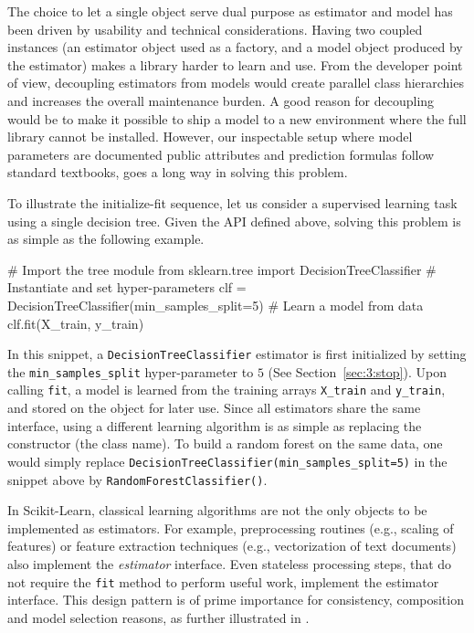 The choice to let a single object serve dual purpose as estimator and model has
been driven by usability and technical considerations. Having two coupled
instances (an estimator object used as a factory, and a model object produced
by the estimator) makes a library harder to learn and use. From the developer
point of view, decoupling estimators from models would create parallel class
hierarchies and increases the overall maintenance burden. A good reason for
decoupling would be to make it possible to ship a model to a new environment
where the full library cannot be installed. However, our inspectable setup
where model parameters are documented public attributes and prediction formulas
follow standard textbooks, goes a long way in solving this problem.

To illustrate the initialize-fit sequence, let us consider a supervised
learning task using a single decision tree. Given the API defined above,
solving this problem is as simple as the following example.

\vskip0.3cm
\begin{pythoncode}
# Import the tree module
from sklearn.tree import DecisionTreeClassifier
# Instantiate and set hyper-parameters
clf = DecisionTreeClassifier(min_samples_split=5)
# Learn a model from data
clf.fit(X_train, y_train)
\end{pythoncode}

In this snippet, a \texttt{DecisionTreeClassifier} estimator is first
initialized by setting the \texttt{min\_samples\_split} hyper-parameter to $5$
(See Section~\ref{sec:3:stop}). Upon calling \texttt{fit}, a model is learned
from the training arrays \texttt{X\_train} and \texttt{y\_train}, and stored on
the object for later use. Since all estimators share the same interface, using
a different learning algorithm is as simple as replacing the constructor (the
class name). To build a random forest on the same data, one would simply
replace \texttt{DecisionTreeClassifier(min\_samples\_split=5)} in the snippet
above by \texttt{RandomForestClassifier()}.

In Scikit-Learn, classical learning algorithms are not the only objects to be
implemented as estimators. For example, preprocessing routines (e.g., scaling
of features) or feature extraction techniques (e.g., vectorization of text
documents) also implement the \textit{estimator} interface. Even stateless
processing steps, that do not require the \texttt{fit} method to perform useful
work, implement the estimator interface. This design pattern is of prime
importance for consistency, composition and model selection reasons,
as further illustrated in \citep{buitinck:2013}.

